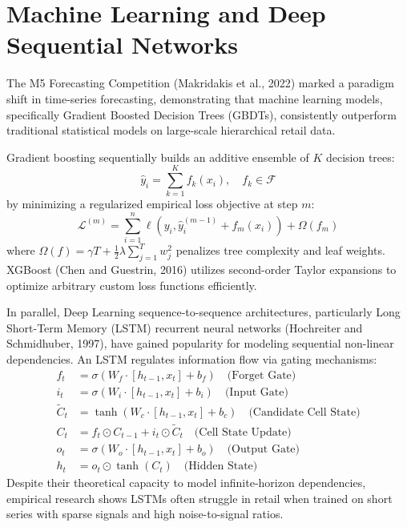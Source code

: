 \documentclass[12pt,a4paper,oneside]{report}
\theoremstyle{definition}
\begin{document}
\section{Machine Learning and Deep Sequential Networks}
The M5 Forecasting Competition (Makridakis et al., 2022) marked a paradigm shift in time-series forecasting, demonstrating that machine learning models, specifically Gradient Boosted Decision Trees (GBDTs), consistently outperform traditional statistical models on large-scale hierarchical retail data.

Gradient boosting sequentially builds an additive ensemble of $K$ decision trees:
\begin{equation}
\hat{y}_i = \sum_{k=1}^K f_k(x_i), \quad f_k \in \mathcal{F}
\end{equation}
by minimizing a regularized empirical loss objective at step $m$:
\begin{equation}
\mathcal{L}^{(m)} = \sum_{i=1}^n \ell\left(y_i, \hat{y}_i^{(m-1)} + f_m(x_i)\right) + \Omega(f_m)
\end{equation}
where $\Omega(f) = \gamma T + \frac{1}{2}\lambda \sum_{j=1}^T w_j^2$ penalizes tree complexity and leaf weights. XGBoost (Chen and Guestrin, 2016) utilizes second-order Taylor expansions to optimize arbitrary custom loss functions efficiently.

In parallel, Deep Learning sequence-to-sequence architectures, particularly Long Short-Term Memory (LSTM) recurrent neural networks (Hochreiter and Schmidhuber, 1997), have gained popularity for modeling sequential non-linear dependencies. An LSTM regulates information flow via gating mechanisms:
\begin{align}
f_t &= \sigma(W_f \cdot [h_{t-1}, x_t] + b_f) \quad \text{(Forget Gate)} \\
i_t &= \sigma(W_i \cdot [h_{t-1}, x_t] + b_i) \quad \text{(Input Gate)} \\
\tilde{C}_t &= \tanh(W_c \cdot [h_{t-1}, x_t] + b_c) \quad \text{(Candidate Cell State)} \\
C_t &= f_t \odot C_{t-1} + i_t \odot \tilde{C}_t \quad \text{(Cell State Update)} \\
o_t &= \sigma(W_o \cdot [h_{t-1}, x_t] + b_o) \quad \text{(Output Gate)} \\
h_t &= o_t \odot \tanh(C_t) \quad \text{(Hidden State)}
\end{align}
Despite their theoretical capacity to model infinite-horizon dependencies, empirical research shows LSTMs often struggle in retail when trained on short series with sparse signals and high noise-to-signal ratios.
\end{document}
